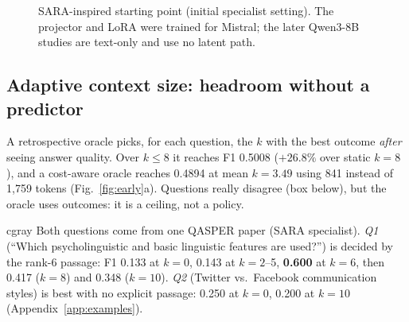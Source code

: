 \documentclass[10pt,twocolumn,letterpaper]{article}
\newcommand{\qasper}{\textsc{QASPER}\xspace}
\begin{document}
\begin{figure}[t]\centering
{}
\caption{SARA-inspired starting point (initial specialist setting). The projector and LoRA were trained for Mistral; the later Qwen3-8B studies are text-only and use no latent path.}\label{fig:sara}
\end{figure}

\subsection{Adaptive context size: headroom without a predictor}
A retrospective oracle picks, for each question, the $k$ with the best outcome \emph{after} seeing answer quality. Over $k\le8$ it reaches F1 0.5008 ($+26.8\%$ over static $k{=}8$), and a cost-aware oracle reaches 0.4894 at mean $k{=}3.49$ using 841 instead of 1,759 tokens (Fig.~\ref{fig:early}a). Questions really disagree (box below), but the oracle uses outcomes: it is a ceiling, not a policy.

\begin{case}[title={Example: two questions, opposite context needs}]{cgray}
Both questions come from one \qasper paper (SARA specialist). \emph{Q1} (``Which psycholinguistic and basic linguistic features are used?'') is decided by the rank-6 passage: F1 0.133 at $k{=}0$, 0.143 at $k{=}2$--5, \textbf{0.600} at $k{=}6$, then 0.417 ($k{=}8$) and 0.348 ($k{=}10$). \emph{Q2} (Twitter vs.\ Facebook communication styles) is best with no explicit passage: 0.250 at $k{=}0$, 0.200 at $k{=}10$ (Appendix~\ref{app:examples}).
\end{case}
\end{document}
